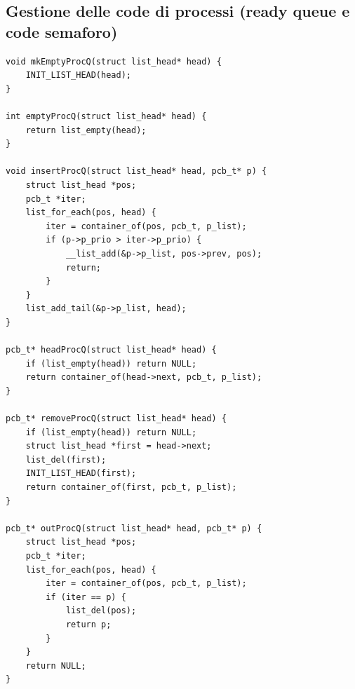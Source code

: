 \documentclass[11pt,a4paper]{article}
\begin{document}
\subsection{Gestione delle code di processi (ready queue e code semaforo)}
\label{sub:code-processi-fase1}
\begin{lstlisting}
void mkEmptyProcQ(struct list_head* head) {
    INIT_LIST_HEAD(head);
}

int emptyProcQ(struct list_head* head) {
    return list_empty(head);
}

void insertProcQ(struct list_head* head, pcb_t* p) {
    struct list_head *pos;
    pcb_t *iter;
    list_for_each(pos, head) {
        iter = container_of(pos, pcb_t, p_list);
        if (p->p_prio > iter->p_prio) {
            __list_add(&p->p_list, pos->prev, pos);
            return;
        }
    }
    list_add_tail(&p->p_list, head);
}

pcb_t* headProcQ(struct list_head* head) {
    if (list_empty(head)) return NULL;
    return container_of(head->next, pcb_t, p_list);
}

pcb_t* removeProcQ(struct list_head* head) {
    if (list_empty(head)) return NULL;
    struct list_head *first = head->next;
    list_del(first);
    INIT_LIST_HEAD(first);
    return container_of(first, pcb_t, p_list);
}

pcb_t* outProcQ(struct list_head* head, pcb_t* p) {
    struct list_head *pos;
    pcb_t *iter;
    list_for_each(pos, head) {
        iter = container_of(pos, pcb_t, p_list);
        if (iter == p) {
            list_del(pos);
            return p;
        }
    }
    return NULL;
}
\end{lstlisting}
\end{document}
